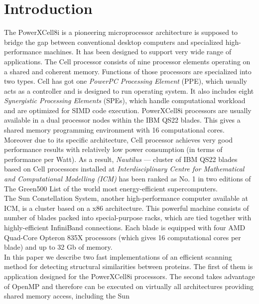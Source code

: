 \section{Introduction}
The PowerXCell8i is a pioneering microprocessor architecture
is supposed to bridge the gap between conventional desktop computers and
specialized high-performance machines.
It has been designed to support very wide range of applications.
The Cell processor consists of nine processor elements operating on a
shared and coherent memory.
Functions of those processors are specialized into two types.
Cell has got one \emph{PowerPC Processing Element} (PPE), which usually acts
as a controller and is designed to run operating system.
It also includes eight \emph{Synergistic Processing Elements} (SPEs), which
handle computational workload and are optimized for SIMD code execution.
PowerXCell8i processors are usually available in a dual processor nodes within
the IBM QS22 blades.
This gives a shared memory programming environment with 16
computational cores.
Moreover due to its specific architecture, Cell processor achieves very good
performance results with relatively low power consumption (in terms of
performance per Watt).
As a result, \emph{Nautilus} \cite{nau} --- cluster of IBM QS22 blades based on
Cell processors installed at \emph{Interdisciplinary Centre for Mathematical and
Computational Modelling (ICM)} has been ranked as No. 1 in two editions of
The Green500 List \cite{g500} of the world most energy-efficient supercomputers.\\
The Sun Constellation System, another high-performance computer available at ICM,
is a cluster based on a x86 architecture.
This powerful machine consists of number of blades packed into special-purpose
racks, which are tied together with highly-efficient InfiniBand connections.
Each blade is equipped with four AMD Quad-Core Opteron 835X processors (which
gives 16 computational cores per blade) and up to 32 Gb of memory.\\
In this paper we describe two fast implementations of an efficient scanning
method for detecting structural similarities between proteins.
The first of them is application designed for the PowerXCell8i processors.
The second takes advantage of OpenMP and therefore can be executed on
virtually all architectures providing shared memory access, including the Sun

